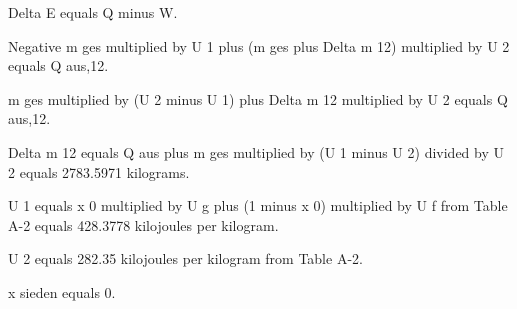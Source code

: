 Delta E equals Q minus W.  

Negative m ges multiplied by U 1 plus (m ges plus Delta m 12) multiplied by U 2 equals Q aus,12.  

m ges multiplied by (U 2 minus U 1) plus Delta m 12 multiplied by U 2 equals Q aus,12.  

Delta m 12 equals Q aus plus m ges multiplied by (U 1 minus U 2) divided by U 2 equals 2783.5971 kilograms.  

U 1 equals x 0 multiplied by U g plus (1 minus x 0) multiplied by U f from Table A-2 equals 428.3778 kilojoules per kilogram.  

U 2 equals 282.35 kilojoules per kilogram from Table A-2.  

x sieden equals 0.
